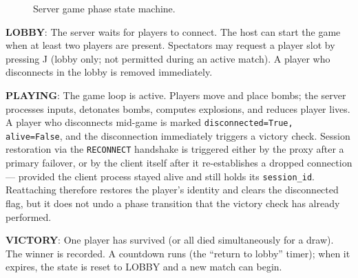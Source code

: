 \documentclass{scrartcl}
\begin{document}
\begin{figure}[h]
\centering
{}
\caption{Server game phase state machine.}
\label{fig:fsm}
\end{figure}

\textbf{LOBBY}: The server waits for players to connect.
The host can start the game when at least two players are present.
Spectators may request a player slot by pressing J (lobby only; not permitted during an active match).
A player who disconnects in the lobby is removed immediately.

\textbf{PLAYING}: The game loop is active.
Players move and place bombs; the server processes inputs, detonates bombs, computes explosions, and reduces player lives.
A player who disconnects mid-game is marked \texttt{disconnected=True, alive=False}, and the disconnection immediately triggers a victory check.
Session restoration via the \texttt{RECONNECT} handshake is triggered either by the
proxy after a primary failover, or by the client itself after it re-establishes a
dropped connection --- provided the client process stayed alive and still holds its
\texttt{session\_id}.
Reattaching therefore restores the player's identity and clears the disconnected
flag, but it does not undo a phase transition that the victory check has already
performed.

\textbf{VICTORY}: One player has survived (or all died simultaneously for a draw).
The winner is recorded.
A countdown runs (the ``return to lobby'' timer); when it expires, the state is reset to LOBBY and a new match can begin.
\end{document}
